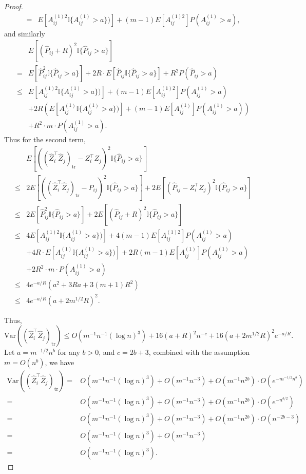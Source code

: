 \begin{proof}
\begin{align*}
	= & E[A_{ij}^{(1)2} \mathbb{I} \{ A_{ij}^{(1)} > a \})] + (m-1) E[A_{ij}^{(1)2}] P(A_{ij}^{(1)} > a),
\end{align*}
and similarly
\begin{align*}
	& E[(\hat{P}_{ij} + R)^2 \mathbb{I} \{ \hat{P}_{ij} > a \}] \\
	= & E[\hat{P}_{ij}^2 \mathbb{I} \{ \hat{P}_{ij} > a \}] + 2R \cdot E[\hat{P}_{ij} \mathbb{I} \{ \hat{P}_{ij} > a \}] + R^2 P(\hat{P}_{ij} > a) \\
	\le & E[A_{ij}^{(1)2} \mathbb{I} \{ A_{ij}^{(1)} > a \})] + (m-1) E[A_{ij}^{(1)2}] P(A_{ij}^{(1)} > a) \\
	& + 2R \left( E[A_{ij}^{(1)} \mathbb{I} \{ A_{ij}^{(1)} > a \})] + (m-1) E[A_{ij}^{(1)}] P(A_{ij}^{(1)} > a) \right) \\
	& + R^2 \cdot m \cdot P(A_{ij}^{(1)} > a).
\end{align*}
Thus for the second term,
\begin{align*}
	& E[((\hat{Z}_i^{\top} \hat{Z}_j)_{\mathrm{tr}} - Z_i^{\top} Z_j)^2 \mathbb{I}\{\hat{P}_{ij} > a\}] \\
	\le & 2 E[((\hat{Z}_i^{\top} \hat{Z}_j)_{\mathrm{tr}} - \hat{P}_{ij})^2 \mathbb{I}\{\hat{P}_{ij} > a\}] + 2 E[(\hat{P}_{ij} - Z_i^{\top} Z_j)^2 \mathbb{I}\{\hat{P}_{ij} > a\}] \\
	\le & 2 E[\hat{P}_{ij}^2 \mathbb{I}\{\hat{P}_{ij} > a\}] + 2 E[(\hat{P}_{ij} + R)^2 \mathbb{I}\{\hat{P}_{ij} > a\}] \\
	\le & 4 E[A_{ij}^{(1)2} \mathbb{I} \{ A_{ij}^{(1)} > a \})] + 4(m-1) E[A_{ij}^{(1)2}] P(A_{ij}^{(1)} > a) \\
	& + 4R \cdot E[A_{ij}^{(1)} \mathbb{I} \{ A_{ij}^{(1)} > a \})] + 2R(m-1) E[A_{ij}^{(1)}] P(A_{ij}^{(1)} > a) \\
	& + 2R^2 \cdot m \cdot P(A_{ij}^{(1)} > a) \\
	\le & 4 e^{-a/R} \left( a^2 + 3R a + 3(m+1)R^2 \right) \\
	\le & 4 e^{-a/R} (a + 2 m^{1/2} R)^2.
\end{align*}

Thus,
\[
	\mathrm{Var}((\hat{Z}_i^{\top} \hat{Z}_j)_{\mathrm{tr}}) \le
	O(m^{-1} n^{-1} (\log n)^3) + 16 (a+R)^2 n^{-c} + 16 (a+2 m^{1/2} R)^2 e^{-a/R}.
\]
Let $a = m^{-1/2} n^{b}$ for any $b > 0$, and $c = 2b + 3$, combined with the assumption $m = O(n^{b})$, we have
\begin{align*}
	\mathrm{Var}((\hat{Z}_i^{\top} \hat{Z}_j)_{\mathrm{tr}})
	= & O(m^{-1} n^{-1} (\log n)^3) + O(m^{-1} n^{-3}) + O(m^{-1} n^{2b}) \cdot O(e^{-m^{-1/2} n^{b}}) \\
	= & O(m^{-1} n^{-1} (\log n)^3) + O(m^{-1} n^{-3}) + O(m^{-1} n^{2b}) \cdot O(e^{- n^{b/2}}) \\
	= & O(m^{-1} n^{-1} (\log n)^3) + O(m^{-1} n^{-3}) + O(m^{-1} n^{2b}) \cdot O(n^{-2b-3}) \\
	= & O(m^{-1} n^{-1} (\log n)^3) + O(m^{-1} n^{-3}) \\
	= & O(m^{-1} n^{-1} (\log n)^3).
\end{align*}
\end{proof}


